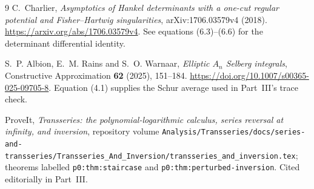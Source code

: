 \documentclass[11pt,a4paper]{article}
\numberwithin{equation}{section}
\theoremstyle{remark}\newtheorem{remark}[theorem]{Remark}
\begin{document}
\begin{thebibliography}{9}
C.~Charlier,
\emph{Asymptotics of Hankel determinants with a one-cut regular potential
and Fisher--Hartwig singularities},
arXiv:1706.03579v4 (2018).
\url{https://arxiv.org/abs/1706.03579v4}.
See equations (6.3)--(6.6) for the determinant differential identity.

S.~P. Albion, E.~M. Rains and S.~O. Warnaar,
\emph{Elliptic $A_n$ Selberg integrals},
Constructive Approximation \textbf{62} (2025), 151--184.
\url{https://doi.org/10.1007/s00365-025-09705-8}.
Equation (4.1) supplies the Schur average used in Part~III's trace check.

ProveIt, \emph{Transseries: the polynomial-logarithmic calculus, series
reversal at infinity, and inversion}, repository volume
\nolinkurl{Analysis/Transseries/docs/series-and-transseries/Transseries_And_Inversion/transseries_and_inversion.tex};
theorems labelled \texttt{p0:thm:staircase} and
\texttt{p0:thm:perturbed-inversion}. Cited editorially in Part~III.
\end{thebibliography}
\end{document}
